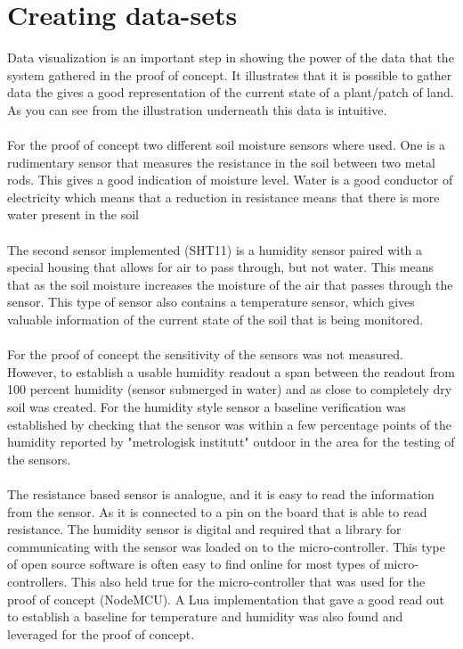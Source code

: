 \documentclass[]{uiophd}
\begin{document}
\section{Creating data-sets}
Data visualization is an important step in showing the power of the data that the system gathered in the proof of concept. It illustrates that it is possible to gather data the gives a good representation of the current state of a plant/patch of land. As you can see from the illustration underneath this data is intuitive.
\\\\
For the proof of concept two different soil moisture sensors where used. One is a rudimentary sensor that measures the resistance in the soil between two metal rods. This gives a good indication of moisture level. Water is a good conductor of electricity which means that a reduction in resistance means that there is more water present in the soil
\\\\
The second sensor implemented (SHT11) is a humidity sensor paired with a special housing that allows for air to pass through, but not water. This means that as the soil moisture increases the moisture of the air that passes through the sensor. This type of sensor also contains a temperature sensor, which gives valuable information of the current state of the soil that is being monitored.
\\\\
For the proof of concept the sensitivity of the sensors was not measured. However, to establish a usable humidity readout a span between the readout from 100 percent humidity (sensor submerged in water) and as close to completely dry soil was created. For the humidity style sensor a baseline verification was established by checking that the sensor was within a few percentage points of the humidity reported by "metrologisk institutt" outdoor in the area for the testing of the sensors.
\\\\
The resistance based sensor is analogue, and it is easy to read the information from the sensor. As it is connected to a pin on the board that is able to read resistance. The humidity sensor is digital and required that a library for communicating with the sensor was loaded on to the micro-controller. This type of open source software is often easy to find online for most types of micro-controllers. This also held true for the micro-controller that was used for the proof of concept (NodeMCU). A Lua implementation that gave a good read out to establish a baseline for temperature and humidity was also found and leveraged for the proof of concept.
\end{document}
